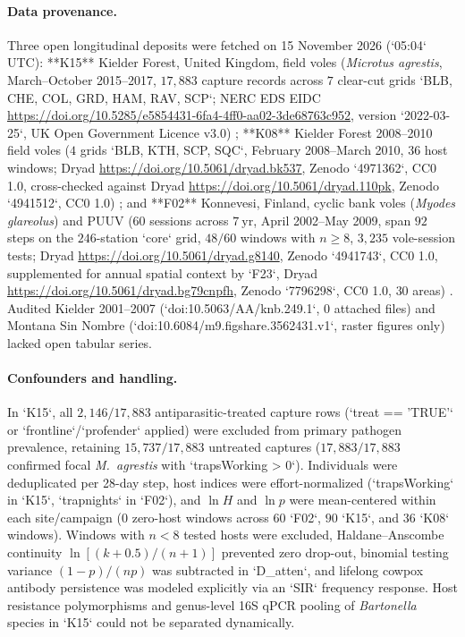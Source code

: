 \paragraph{Data provenance.}
Three open longitudinal deposits were fetched on 15 November 2026 (`05:04` UTC): **K15** Kielder Forest, United Kingdom, field voles (\textit{Microtus agrestis}, March--October 2015--2017, $17{,}883$ capture records across $7$ clear-cut grids `BLB, CHE, COL, GRD, HAM, RAV, SCP`; NERC EDS EIDC \url{https://doi.org/10.5285/e5854431-6fa4-4ff0-aa02-3de68763c952}, version `2022-03-25`, UK Open Government Licence v3.0) \citep{paterson2022}; **K08** Kielder Forest 2008--2010 field voles ($4$ grids `BLB, KTH, SCP, SQC`, February 2008--March 2010, $36$ host windows; Dryad \url{https://doi.org/10.5061/dryad.bk537}, Zenodo `4971362`, CC0 1.0, cross-checked against Dryad \url{https://doi.org/10.5061/dryad.110pk}, Zenodo `4941512`, CC0 1.0) \citep{jackson2014,arriero2018}; and **F02** Konnevesi, Finland, cyclic bank voles (\textit{Myodes glareolus}) and PUUV ($60$ sessions across $7\ \mathrm{yr}$, April 2002--May 2009, span $92$ steps on the $246$-station `core` grid, $48/60$ windows with $n \ge 8$, $3{,}235$ vole-session tests; Dryad \url{https://doi.org/10.5061/dryad.g8140}, Zenodo `4941743`, CC0 1.0, supplemented for annual spatial context by `F23`, Dryad \url{https://doi.org/10.5061/dryad.bg79cnpfh}, Zenodo `7796298`, CC0 1.0, $30$ areas) \citep{voutilainen2016,wang2023}. Audited Kielder 2001--2007 (`doi:10.5063/AA/knb.249.1`, $0$ attached files) and Montana Sin Nombre (`doi:10.6084/m9.figshare.3562431.v1`, raster figures only) lacked open tabular series.

\paragraph{Confounders and handling.}
In `K15`, all $2{,}146/17{,}883$ antiparasitic-treated capture rows (`treat == 'TRUE'` or `frontline`/`profender` applied) were excluded from primary pathogen prevalence, retaining $15{,}737/17{,}883$ untreated captures ($17{,}883/17{,}883$ confirmed focal \textit{M.~agrestis} with `trapsWorking > 0`). Individuals were deduplicated per 28-day step, host indices were effort-normalized (`trapsWorking` in `K15`, `trapnights` in `F02`), and $\ln H$ and $\ln p$ were mean-centered within each site/campaign ($0$ zero-host windows across $60$ `F02`, $90$ `K15`, and $36$ `K08` windows). Windows with $n < 8$ tested hosts were excluded, Haldane--Anscombe continuity $\ln[(k+0.5)/(n+1)]$ prevented zero drop-out, binomial testing variance $(1-p)/(np)$ was subtracted in `D\_atten`, and lifelong cowpox antibody persistence was modeled explicitly via an `SIR` frequency response. Host resistance polymorphisms and genus-level 16S qPCR pooling of \textit{Bartonella} species in `K15` could not be separated dynamically.

